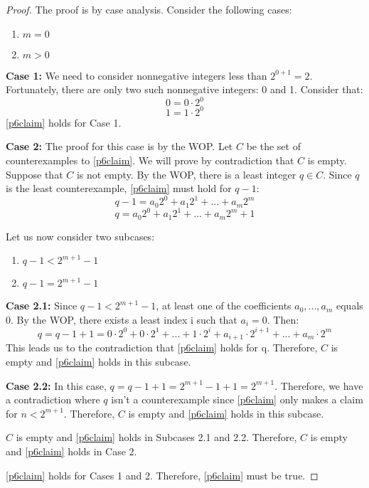 \documentclass{article}
\begin{document}
\begin{proof}
	The proof is by case analysis. Consider the following cases:
	\begin{enumerate}
		\item $m = 0$
		\item $m > 0$
	\end{enumerate}

	\textbf{Case 1:}
	We need to consider nonnegative integers less than $2^{0 + 1} = 2$. Fortunately, there are only two such nonnegative integers: 0 and 1. Consider that:
	\[
		0 = 0 \cdot 2^0
	\]
	\[
		1 = 1 \cdot 2^0
	\]
	\eqref{p6claim} holds for Case 1.

	\textbf{Case 2:}
	The proof for this case is by the WOP. Let $C$ be the set of counterexamples to \eqref{p6claim}. We will prove by contradiction that $C$ is empty. Suppose that $C$ is not empty. By the WOP, there is a least integer $q \in C$. Since $q$ is the least counterexample, \eqref{p6claim} must hold for $q - 1$:
	\[
		q - 1 = a_0 2^0 + a_1 2^1 + ... + a_m 2^m
	\]
	\[
		q = a_0 2^0 + a_1 2^1 + ... + a_m 2^m + 1
	\]

	Let us now consider two subcases:
	\begin{enumerate}
		\item $q - 1 < 2^{m + 1} - 1$
		\item $q - 1 = 2^{m + 1} - 1$
	\end{enumerate}

	\textbf{Case 2.1:}
	Since $q - 1 < 2^{m + 1} - 1$, at least one of the coefficients $a_0, ..., a_m$ equals 0. By the WOP, there exists a least index i such that $a_i = 0$. Then:
	\[
		q = q - 1 + 1 = 0 \cdot 2^0 + 0 \cdot 2^1 + ... + 1 \cdot 2^i + a_{i+1} \cdot 2^{i+1} + ... + a_m \cdot 2^m
	\]
	This leads us to the contradiction that \eqref{p6claim} holds for q. Therefore, $C$ is empty and \eqref{p6claim} holds in this subcase.

	\textbf{Case 2.2:}
	In this case, $q = q - 1 + 1 = 2^{m+1} - 1 + 1 = 2^{m + 1}$. Therefore, we have a contradiction where $q$ isn't a counterexample since \eqref{p6claim} only makes a claim for $n < 2^{m + 1}$. Therefore, $C$ is empty and \eqref{p6claim} holds in this subcase.

	$C$ is empty and \eqref{p6claim} holds in Subcases 2.1 and 2.2. Therefore, $C$ is empty and \eqref{p6claim} holds in Case 2.

	\eqref{p6claim} holds for Cases 1 and 2. Therefore, \eqref{p6claim} must be true.

\end{proof}
\end{document}

